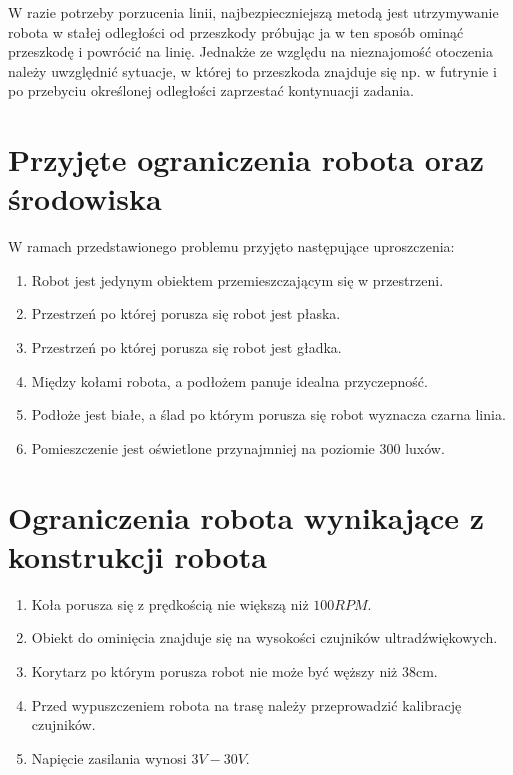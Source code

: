 W razie potrzeby porzucenia linii, najbezpieczniejszą metodą jest utrzymywanie robota w stałej odległości od przeszkody próbując ja w ten sposób ominąć przeszkodę i powrócić na linię. Jednakże ze względu na nieznajomość otoczenia należy uwzględnić sytuacje, w której to przeszkoda znajduje się np. w futrynie i po przebyciu określonej odległości zaprzestać kontynuacji zadania.

\section{Przyjęte ograniczenia robota oraz środowiska}
W ramach przedstawionego problemu przyjęto następujące uproszczenia:
\begin{enumerate}
    \item Robot jest jedynym obiektem przemieszczającym się w przestrzeni.
    \item Przestrzeń po której porusza się robot jest płaska.
    \item Przestrzeń po której porusza się robot jest gładka.
    \item Między kołami robota, a podłożem panuje idealna przyczepność.
    \item Podłoże jest białe, a ślad po którym porusza się robot wyznacza czarna linia.
    \item Pomieszczenie jest oświetlone przynajmniej na poziomie 300 luxów.
\end{enumerate}

\section{Ograniczenia robota wynikające z konstrukcji robota}
\begin{enumerate}
    \item Koła porusza się z prędkością nie większą niż $100RPM$.
    \item Obiekt do ominięcia znajduje się na wysokości czujników ultradźwiękowych.
    \item Korytarz po którym porusza robot nie może być węższy niż 38cm.
    \item Przed wypuszczeniem robota na trasę należy przeprowadzić kalibrację czujników.
    \item Napięcie zasilania wynosi $3V-30V$.
\end{enumerate}